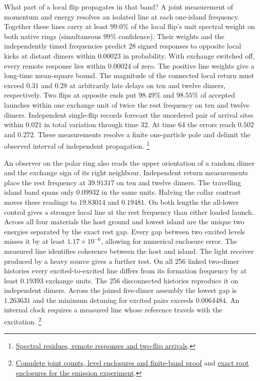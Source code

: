 \documentclass[11pt]{article}
\theoremstyle{definition}
\theoremstyle{remark}
\theoremstyle{plain}
\begin{document}
What part of a local flip propagates in that band? A joint measurement
of momentum and energy resolves an isolated line at each one-island
frequency. Together these lines carry at least $99.0\%$ of the local
flip's unit spectral weight on both native rings (simultaneous $99\%$
confidence). Their weights and the independently timed frequencies
predict 28 signed responses to opposite local kicks at distant
dimers within $0.00023$ in probability. With exchange switched off,
every remote response lies within $0.00024$ of zero. The positive line
weights give a long-time mean-square bound. The magnitude of the connected
local return must exceed $0.31$ and $0.28$ at arbitrarily late delays on
ten and twelve dimers, respectively. Two flips at opposite ends put $98.49\%$ and $98.55\%$ of accepted launches within one exchange
unit of twice the rest frequency on ten and twelve dimers. Independent
single-flip records forecast the unordered pair of arrival sites within
$0.021$ in total variation through time 32. At time 64 the errors reach
$0.502$ and $0.272$. These measurements resolve a finite one-particle
pole and delimit the observed interval of independent propagation.%
\footnote{\href{https://github.com/FloatingPragma/observer-patch-holography/tree/main/model/experiments/material_inertia/pair_spectrum/neutral_guide/polar_ring/two_point}{Spectral residues, remote responses and two-flip arrivals}.}

An observer on the polar ring also reads the upper orientation of a
random dimer and the exchange sign of its right neighbour. Independent
return measurements place the rest frequency at $39.91317$ on ten and
twelve dimers. The travelling island band spans only $0.09932$ in the
same units. Halving the collar contrast moves these readings to
$19.83014$ and $0.19481$. On both lengths the all-lower control gives a
stronger local line at the rest frequency than either loaded launch.
Across all four materials the host ground and lowest island are the
unique two energies separated by the exact rest gap. Every gap between
two excited levels misses it by at least $1.17\times10^{-6}$, allowing
for numerical enclosure error. The measured line identifies coherence
between the host and island. The light receiver produced by a heavy
source gives a further test. On all 256 linked two-dimer histories
every excited-to-excited line differs from its formation frequency by
at least $0.19393$ exchange units. The 256 disconnected histories
reproduce it on independent dimers. Across the joined five-dimer
assembly the lowest gap is $1.263631$ and the minimum detuning for
excited pairs exceeds $0.0064484$. An internal clock requires a measured line whose reference travels with the excitation.%
\footnote{\href{https://github.com/FloatingPragma/observer-patch-holography/tree/main/model/candidate_laws/interval_echo/openwave/row_03_clock/polar_island}{Complete joint counts, level enclosures and finite-band proof} and \href{https://github.com/FloatingPragma/observer-patch-holography/tree/main/model/candidate_laws/interval_echo/openwave/row_03_clock/emitted_material}{exact root enclosures for the emission experiment}.}
\end{document}
